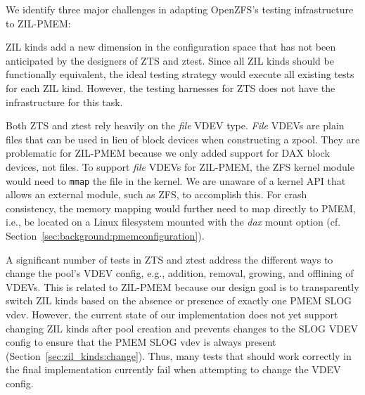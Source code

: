 \documentclass[12pt,a4paper,twoside]{book}
\begin{document}
We identify three major challenges in adapting OpenZFS's testing infrastructure to ZIL-PMEM:
\begin{description}[noitemsep]
    \item[Dimensionality] ZIL kinds add a new dimension in the configuration space that has not been anticipated by the designers of ZTS and ztest.
        Since all ZIL kinds should be functionally equivalent, the ideal testing strategy would execute all existing tests for each ZIL kind.
        However, the testing harnesses for ZTS does not have the infrastructure for this task.

    \item[File VDEVs] Both ZTS and ztest rely heavily on the \textit{file} VDEV type.
        \textit{File} VDEVs are plain files that can be used in lieu of block devices when constructing a zpool.
        They are problematic for ZIL-PMEM because we only added support for DAX block devices, not files.
        To support \textit{file} VDEVs for ZIL-PMEM, the ZFS kernel module would need to \lstinline{mmap} the file in the kernel.
        We are unaware of a kernel API that allows an external module, such as ZFS, to accomplish this.
        For crash consistency, the memory mapping would further need to map directly to PMEM, i.e., be located on a Linux filesystem mounted with the \textit{dax} mount option (cf. Section~\ref{sec:background:pmemconfiguration}).

    \item[VDEV Management]
        A significant number of tests in ZTS and ztest address the different ways to change the pool's VDEV config, e.g., addition, removal, growing, and offlining of VDEVs.
        This is related to ZIL-PMEM because our design goal is to transparently switch ZIL kinds based on the absence or presence of exactly one PMEM SLOG vdev.
        However, the current state of our implementation does not yet support changing ZIL kinds after pool creation and prevents changes to the SLOG VDEV config to ensure that the PMEM SLOG vdev is always present (Section~\ref{sec:zil_kinds:change}).
        Thus, many tests that should work correctly in the final implementation currently fail when attempting to change the VDEV config.
\end{description}
\end{document}

